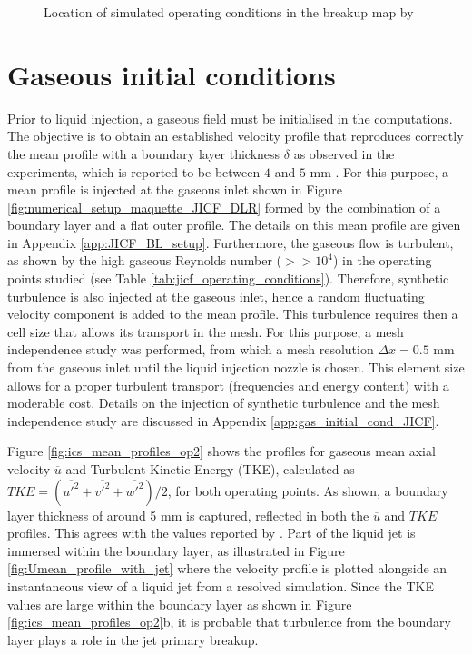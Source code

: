 \begin{figure}[ht]
     \centering
     \caption{Location of simulated operating conditions in the breakup map by \citeColor[wu_breakup_1997]}
      \label{fig:location_JICF_ops_in_breakup_map}
\end{figure}




\clearpage

\section{Gaseous initial conditions}
\label{sec:ch5_initial_conditions}

Prior to liquid injection, a gaseous field must be initialised in the computations. The objective is to obtain an established velocity profile that reproduces correctly the mean profile with a boundary layer thickness $\delta$ as observed in the experiments, which is reported to be between $4$ and $5$ mm . For this purpose, a mean profile is injected at the gaseous inlet shown in Figure \ref{fig:numerical_setup_maquette_JICF_DLR} formed by the combination of a boundary layer and a flat outer profile. The details on this mean profile are given in Appendix \ref{app:JICF_BL_setup}. Furthermore, the gaseous flow is turbulent, as shown by the high gaseous Reynolds number ($>> 10^4$) in the operating points studied (see Table \ref{tab:jicf_operating_conditions}). Therefore, synthetic turbulence is also injected at the gaseous inlet, hence a random fluctuating velocity component is added to the mean profile. This turbulence requires then a cell size that allows its transport in the mesh. For this purpose, a mesh independence study was performed, from which a mesh resolution $\Delta x = 0.5$ mm from the gaseous inlet until the liquid injection nozzle is chosen. This element size allows for a proper turbulent transport (frequencies
and energy content) with a moderable cost. Details on the injection of synthetic turbulence and the mesh independence study are discussed in Appendix \ref{app:gas_initial_cond_JICF}. 

Figure \ref{fig:ics_mean_profiles_op2} shows the profiles for gaseous mean axial velocity $\overline{u}$ and Turbulent Kinetic Energy (TKE), calculated as $TKE = \left( \overline{u'^2} + \overline{v'^2} + \overline{w'^2} \right) / 2$, for both operating points. As shown, a boundary layer thickness of around 5 mm is captured, reflected in both the $\overline{u}$ and $TKE$ profiles. This agrees with the values reported by . Part of the liquid jet is immersed within the boundary layer, as illustrated in Figure \ref{fig:Umean_profile_with_jet} where the velocity profile is plotted alongside an instantaneous view of a liquid jet from a resolved simulation. Since the TKE values are large within the boundary layer as shown in Figure \ref{fig:ics_mean_profiles_op2}b, it is probable that turbulence from the boundary layer plays a role in the jet primary breakup.

